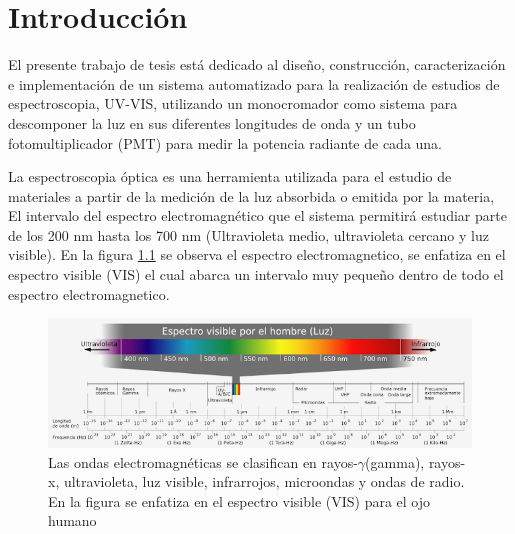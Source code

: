 \chapter{Introducción}
El presente trabajo de tesis está dedicado al diseño, construcción, caracterización e implementación de un sistema automatizado para la realización de estudios de espectroscopia, UV-VIS, utilizando un monocromador como sistema para descomponer la luz  en sus diferentes longitudes de onda y un tubo fotomultiplicador (PMT) para medir la potencia radiante de cada una.

La espectroscopia óptica es una herramienta utilizada para el estudio de materiales a partir de la medición de la luz absorbida o emitida por la materia, El intervalo del espectro electromagnético que el sistema permitirá estudiar parte de los 200 nm hasta los 700 nm (Ultravioleta medio, ultravioleta cercano y luz visible). En la figura \ref{fig:espectrovisible} se observa el espectro electromagnetico, se enfatiza en el espectro visible (VIS) el cual abarca un intervalo muy pequeño dentro de todo el espectro electromagnetico.
\begin{figure}[h!]%
	\centering
	\includegraphics[width=1\linewidth]{Imagenes/espectro_visible}
	\caption[Espectro electromagnético, enfatizando el espectro visible para el ojo humano \cite{espectroOjo}.]{Las ondas electromagnéticas se clasifican en rayos-$\gamma$(gamma), rayos-x, ultravioleta, luz visible, infrarrojos, microondas y ondas de radio. En la figura se enfatiza en el espectro visible (VIS) para el ojo humano \cite{espectroOjo}}
	\label{fig:espectrovisible}
\end{figure}

